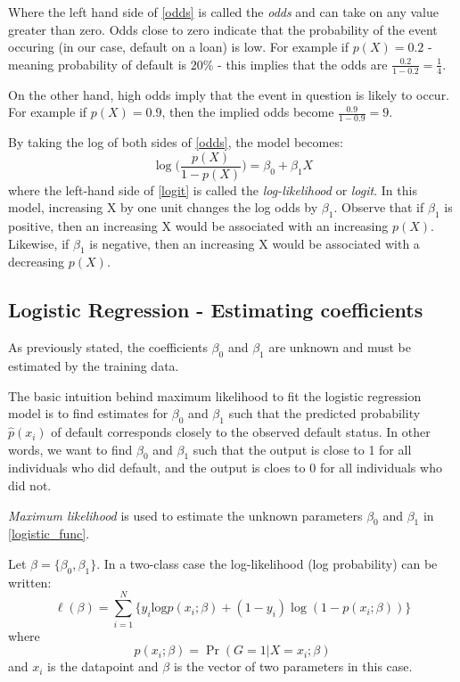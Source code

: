 \documentclass{article}
\numberwithin{equation}{subsection}
\begin{document}
Where the left hand side of \eqref{odds} is called the \textit{odds} and 
can take on any value greater than zero. Odds close to zero indicate that the 
probability of the event occuring (in our case, default on a loan) is low. For example if 
$p(X) = 0.2$ - meaning probability of default is $20\%$ - this implies that the odds are 
$\frac{0.2}{1-0.2} = \frac{1}{4}$.

On the other hand, high odds imply that the event 
in question is likely to occur. For example if $p(X) = 0.9$, then the implied odds become 
$\frac{0.9}{1-0.9} = 9$.

By taking the log of both sides of \eqref{odds}, the model becomes:
\begin{equation}
\log\bigg(\frac{p(X)}{1-p(X)}\bigg) = \beta_0 + \beta_{1}X \label{logit}
\end{equation}
where the left-hand side of \eqref{logit} is called the \textit{log-likelihood} or \textit{logit}. In this model,
increasing X by one unit changes the log odds by $\beta_1$. Observe that if $\beta_1$ is positive, then an 
increasing X would be associated with an increasing $p(X)$. Likewise, if $\beta_1$ is negative, then an
increasing X would be associated with a decreasing $p(X)$.

\subsection{Logistic Regression - Estimating coefficients}
As previously stated, the coefficients $\beta_0$ and $\beta_1$ are unknown and
must be estimated by the training data. 

The basic intuition behind maximum likelihood to fit the logistic regression model is to find
estimates for $\beta_0$ and $\beta_1$ such that the predicted probability $\hat{p}(x_{i})$
of default corresponds closely to the observed default status. In other words, we want to find
$\beta_0$ and $\beta_1$ such that the output is close to 1 for all individuals who did default,
and the output is cloes to 0 for all individuals who did not. 

\textit{Maximum likelihood} is used to estimate the unknown parameters $\beta_0$ and $\beta_1$ 
in \eqref{logistic_func}. 

Let $\beta = \{\beta_{0}, \beta_{1}\}$. In a two-class case the log-likelihood (log probability) can be written:
\begin{equation}
\ell(\beta) = \sum^{N}_{i = 1}\bigg\{y_i\text{log}p(x_i;\beta) + (1 - y_{i}) \log(1-p(x_{i};\beta))\bigg\} \label{loglikelihood}
\end{equation}
where 
\begin{equation}
p(x_{i};\beta) = \Pr (G = 1 | X = x_{i}; \beta)
\end{equation}
and $x_{i}$ is the datapoint and $\beta$ is the vector of two parameters in this case.
\end{document}
